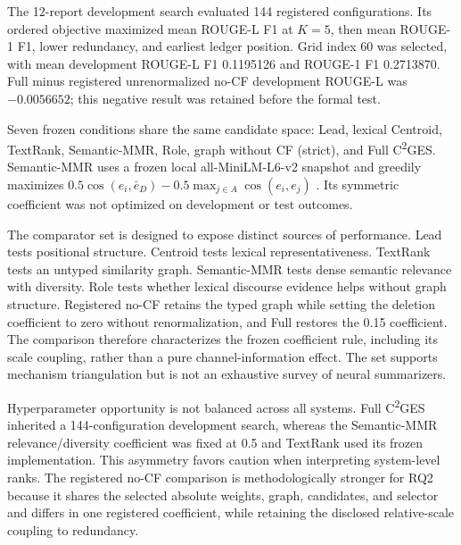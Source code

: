 \documentclass[applsci,article,submit,moreauthors]{Definitions/mdpi}
\newcommand{\cges}{C\textsuperscript{2}GES}
\begin{document}
The 12-report development search evaluated 144 registered configurations. Its ordered objective maximized mean ROUGE-L F1 at $K=5$, then mean ROUGE-1 F1, lower redundancy, and earliest ledger position. Grid index 60 was selected, with mean development ROUGE-L F1 0.1195126 and ROUGE-1 F1 0.2713870. Full minus registered unrenormalized no-CF development ROUGE-L was $-0.0056652$; this negative result was retained before the formal test.

Seven frozen conditions share the same candidate space: Lead, lexical Centroid, TextRank, Semantic-MMR, Role, graph without CF (strict), and Full \cges{}. Semantic-MMR uses a frozen local all-MiniLM-L6-v2 snapshot and greedily maximizes $0.5\cos(e_i,\bar e_D)-0.5\max_{j\in A}\cos(e_i,e_j)$ \cite{reimers2019sentencebert}. Its symmetric coefficient was not optimized on development or test outcomes.

The comparator set is designed to expose distinct sources of performance. Lead tests positional structure. Centroid tests lexical representativeness. TextRank tests an untyped similarity graph. Semantic-MMR tests dense semantic relevance with diversity. Role tests whether lexical discourse evidence helps without graph structure. Registered no-CF retains the typed graph while setting the deletion coefficient to zero without renormalization, and Full restores the 0.15 coefficient. The comparison therefore characterizes the frozen coefficient rule, including its scale coupling, rather than a pure channel-information effect. The set supports mechanism triangulation but is not an exhaustive survey of neural summarizers.

Hyperparameter opportunity is not balanced across all systems. Full \cges{} inherited a 144-configuration development search, whereas the Semantic-MMR relevance/diversity coefficient was fixed at 0.5 and TextRank used its frozen implementation. This asymmetry favors caution when interpreting system-level ranks. The registered no-CF comparison is methodologically stronger for RQ2 because it shares the selected absolute weights, graph, candidates, and selector and differs in one registered coefficient, while retaining the disclosed relative-scale coupling to redundancy.
\end{document}
